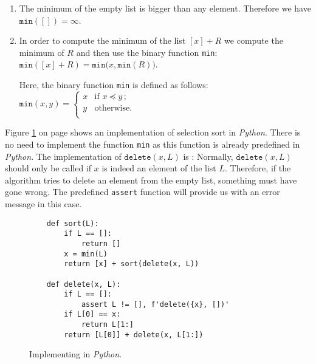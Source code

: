 \begin{enumerate}
\item The minimum of the empty list is bigger than any element.  Therefore we have 
      \\[0.2cm]
      \hspace*{1.3cm} $\mathtt{min}([]) = \infty$.
\item In order to compute the minimum of the list $[x] + R$ we compute the minimum of $R$ and
      then use the binary function \texttt{min}: \\[0.2cm]
      \hspace*{1.3cm} 
      $\mathtt{min}([x] + R) = \mathtt{min}\bigl(x, \mathtt{min}(R) \bigr)$. 

      Here, the binary function \texttt{min} is defined as follows: \\[0.2cm]
      \hspace*{1.3cm} 
      $\mathtt{min}(x,y) = \left\{
      \begin{array}{ll}
        x  & \mbox{if $x \preceq y\,$;} \\
        y  & \mbox{otherwise.} \\
      \end{array}\right.
      $
\end{enumerate}
Figure \ref{fig:selection-sort.setlx} on page \pageref{fig:selection-sort.setlx} shows an
implementation of selection sort in \textsl{Python}.  There is no need to implement the function
\texttt{min} as this function is already predefined in \textsl{Python}. 
The implementation of $\mathtt{delete}(x,L)$ is :  Normally, $\mathtt{delete}(x, L)$
should only be called if $x$ is indeed an element of the list $L$.   Therefore, if the algorithm tries 
to delete an element from the empty list, something must have gone wrong.  The predefined \texttt{assert}
function will provide us with an error message in this case.


\begin{figure}[!ht]
  \centering
\begin{verbatim}
    def sort(L):
        if L == []:
            return []
        x = min(L)
        return [x] + sort(delete(x, L))
    
    def delete(x, L):
        if L == []:
            assert L != [], f'delete({x}, [])'
        if L[0] == x:
            return L[1:]
        return [L[0]] + delete(x, L[1:])
\end{verbatim}
\vspace*{-0.3cm}
  \caption{Implementing  in \textsl{Python}.}
  \label{fig:selection-sort.setlx}
\end{figure}

